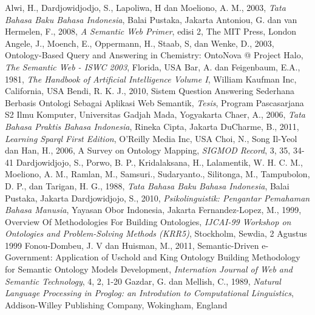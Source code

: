 \begin{thebibliography}{99}
		Alwi, H., Dardjowidjodjo, S., Lapoliwa, H dan Moeliono, A. M., 2003, \emph{Tata Bahasa Baku Bahasa Indonesia}, Balai Pustaka, Jakarta
		Antoniou, G. dan van Hermelen, F., 2008, \emph{A Semantic Web Primer}, edisi 2, The MIT Press, London
		Angele, J., Moench, E., Oppermann, H., Staab, S, dan Wenke, D., 2003, Ontology-Based Query and Answering in Chemistry: OntoNova @ Project Halo, \emph{The Semantic Web - ISWC 2003}, Florida, USA
		Bar, A. dan Feigenbaum, E.A., 1981, \emph{The Handbook of Artificial Intelligence Volume I}, William Kaufman Inc, California, USA
		Bendi, R. K. J., 2010, Sistem Question Answering Sederhana Berbasis Ontologi Sebagai Aplikasi Web Semantik, \emph{Tesis}, Program Pascasarjana S2 Ilmu Komputer, Universitas Gadjah Mada, Yogyakarta
		Chaer, A., 2006, \emph{Tata Bahasa Praktis Bahasa Indonesia}, Rineka Cipta, Jakarta
		DuCharme, B., 2011, \emph{Learning Sparql First Edition}, O'Reilly Media Inc, USA
		Choi, N., Song Il-Yeol dan Han, H., 2006, A Survey on Ontology Mapping, \emph{SIGMOD Record}, 3, 35, 34-41
		Dardjowidjojo, S., Porwo, B. P., Kridalaksana, H., Lalamentik, W. H. C. M., Moeliono, A. M., Ramlan, M., Samsuri., Sudaryanto., Silitonga, M., Tampubolon, D. P., dan Tarigan, H. G., 1988, \emph{Tata Bahasa Baku Bahasa Indonesia}, Balai Pustaka, Jakarta
		Dardjowidjojo, S., 2010, \emph{Psikolinguistik: Pengantar Pemahaman Bahasa Manusia}, Yayasan Obor Indonesia, Jakarta
		Fernandez-Lopez, M., 1999, Overview Of Methodologies For Building Ontologies, \emph{IJCAI-99 Workshop on Ontologies and Problem-Solving Methods (KRR5)}, Stockholm, Sewdia, 2 Agustus 1999
		Fonou-Dombeu, J. V dan Huisman, M., 2011, Semantic-Driven e-Government: Application of Uschold and King Ontology Building Methodology for Semantic Ontology Models Development, \emph{Internation Journal of Web and Semantic Technology}, 4, 2, 1-20
		Gazdar, G. dan Mellish, C., 1989, \emph{Natural Language Processing in Proglog: an Introdution to Computational Linguistics}, Addison-Willey Publishing Company, Wokingham, England

\end{thebibliography}
